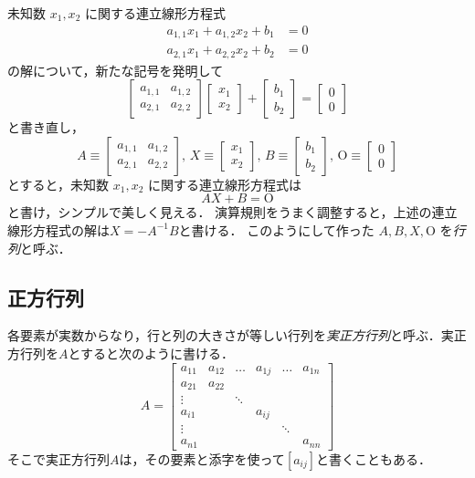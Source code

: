 \documentclass{jsbook}
\newcommand{\keyword}[1]{\emph{#1}}
\newcommand{\zero}{0}%
\newcommand{\Zero}{\mathrm{O}}%
\begin{document}
未知数 $x_1,x_2$ に関する連立線形方程式
\begin{align}
a_{1,1}x_1+a_{1,2}x_2+b_1&=\zero\\
a_{2,1}x_1+a_{2,2}x_2+b_2&=\zero
\end{align}
の解について，新たな記号を発明して
\begin{equation}
\begin{bmatrix}a_{1,1}&a_{1,2}\\a_{2,1}&a_{2,2}\end{bmatrix}\begin{bmatrix}x_1\\x_2\end{bmatrix}+\begin{bmatrix}b_1\\b_2\end{bmatrix}=\begin{bmatrix}\zero\\\zero\end{bmatrix}
\end{equation}
と書き直し，
\begin{equation}
A\equiv\begin{bmatrix}a_{1,1}&a_{1,2}\\a_{2,1}&a_{2,2}\end{bmatrix},\,
X\equiv\begin{bmatrix}x_1\\x_2\end{bmatrix},\,
B\equiv\begin{bmatrix}b_1\\b_2\end{bmatrix},\,
\Zero\equiv\begin{bmatrix}\zero\\\zero\end{bmatrix}
\end{equation}
とすると，未知数 $x_1,x_2$ に関する連立線形方程式は
\begin{equation}
AX+B=\Zero
\end{equation}
と書け，シンプルで美しく見える．
演算規則をうまく調整すると，上述の連立線形方程式の解は$X=-A^{-1}B$と書ける．
このようにして作った $A,B,X,\Zero$ を\keyword{行列}と呼ぶ．

\subsection{正方行列}

各要素が実数からなり，行と列の大きさが等しい行列を\keyword{実正方行列}と呼ぶ．実正方行列を$A$とすると次のように書ける．
\begin{equation}
A=\begin{bmatrix}a_{11}&a_{12}&\dots&a_{1j}&\dots&a_{1n}\\
  a_{21}&a_{22}\\
  \vdots&&\ddots\\
  a_{i1}&&&a_{ij}\\
  \vdots&&&&\ddots\\
  a_{n1}&&&&&a_{nn}\end{bmatrix}
\end{equation}
そこで実正方行列$A$は，その要素と添字を使って$[a_{ij}]$と書くこともある．
\end{document}
